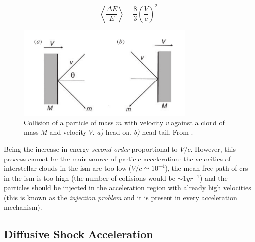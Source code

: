 \documentclass[main.tex]{subfiles}
\begin{document}
\begin{equation}
    \left< \frac{\Delta E}{E}\right> = \frac{8}{3}\left( \frac{V}{c}\right)^2
\end{equation}

\begin{figure}[h]
    \centering
    \includegraphics[width=0.77\textwidth]{Pictures/secondorderfermiacc.pdf}
    \caption{Collision of a particle of mass $m$ with velocity $v$ against a cloud of mass $M$ and velocity $V$. \textit{a)} head-on. \textit{b)} head-tail. From \cite{highenergyastrophy}.}
    \label{fig:fermiprocess}
\end{figure}

Being the increase in energy \textit{second order} proportional to $V/c$. However, this process cannot be the main source of particle acceleration: the velocities of interstellar clouds in the \gls{ism} are too low ($V/c \simeq 10^{-4}$), the mean free path of \glspl{cr} in the \gls{ism} is too high (the number of collisions would be $\sim 1yr^{-1}$) and the particles should be injected in the acceleration region with already high velocities (this is known as the \textit{injection problem} and it is present in every acceleration mechanism).

\subsection{Diffusive Shock Acceleration}
\end{document}
